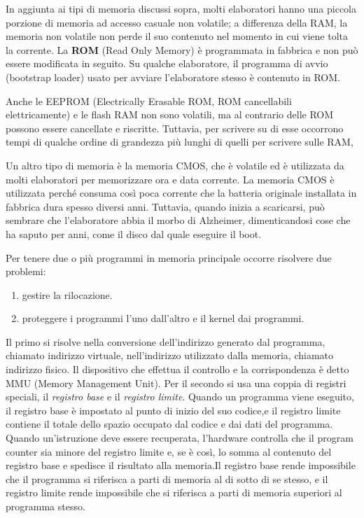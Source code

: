 In aggiunta ai tipi di memoria discussi sopra, molti elaboratori hanno una piccola porzione di memoria ad accesso casuale non volatile; a differenza della RAM, la memoria non volatile non perde il suo contenuto nel momento in cui viene tolta la corrente. La \textbf{ROM} (Read Only Memory) è programmata in fabbrica e non può essere modificata in seguito. Su qualche elaboratore, il programma di avvio (bootstrap loader) usato per avviare l'elaboratore stesso è contenuto in ROM.

Anche le EEPROM (Electrically Erasable ROM, ROM cancellabili elettricamente) e le flash RAM non sono volatili, ma al contrario delle ROM possono essere cancellate e riscritte. Tuttavia, per scrivere su di esse occorrono tempi di qualche ordine di grandezza più lunghi di quelli per scrivere sulle RAM,

Un altro tipo di memoria è la memoria CMOS, che è volatile ed è utilizzata da molti elaboratori per memorizzare ora e data corrente.
La memoria CMOS è utilizzata perché consuma così poca corrente che la batteria originale installata in fabbrica dura spesso diversi anni. Tuttavia, quando inizia a scaricarsi, può sembrare che l'elaboratore abbia il morbo di Alzheimer, dimenticandosi cose che ha saputo per anni, come il disco dal quale eseguire il boot.

Per tenere due o più programmi in memoria principale occorre risolvere due problemi: 
\begin{enumerate}
    \item gestire la rilocazione.
    \item proteggere i programmi l'uno dall'altro e il kernel dai programmi.
\end{enumerate}
%
Il primo si risolve nella conversione dell'indirizzo generato dal programma, chiamato indirizzo virtuale, nell'indirizzo utilizzato dalla memoria, chiamato indirizzo fisico. Il dispositivo che effettua il controllo e la corrispondenza è detto MMU (Memory Management Unit).
%
Per il secondo si usa una coppia di registri speciali, il \textit{registro base} e il \textit{registro limite}. Quando un programma viene eseguito, il registro base è impostato al punto di inizio del suo codice,e il registro limite contiene il totale dello spazio occupato dal codice e dai dati del programma. Quando un'istruzione deve essere recuperata, l'hardware controlla che il program counter sia minore del registro limite e, se è così, lo somma al contenuto del registro base e spedisce il risultato alla memoria.Il registro base rende impossibile che il programma si riferisca a parti di memoria al di sotto di se stesso, e il registro limite rende impossibile che si riferisca a parti di memoria superiori al programma stesso.

